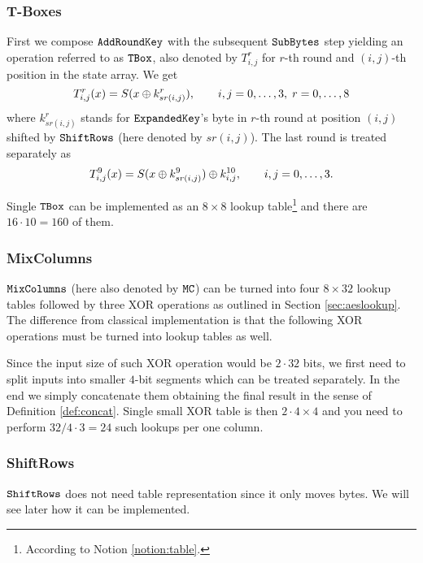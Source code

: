 \subsubsection{T-Boxes}
	
	First we compose $\texttt{AddRoundKey}$ with the subsequent $\texttt{SubBytes}$ step yielding an operation referred to as $\texttt{TBox}$, also denoted by $T_{i,j}^r$ for $r$-th round and $(i,j)$-th position in the state array. We get
	\begin{equation}
		T_{i,j}^r(x) = S(x\oplus k_{sr(i,j)}^r) , \qquad i,j=0 , \ldots , 3,\;r=0 , \ldots , 8
	\end{equation}
	where $k_{sr(i,j)}^r$ stands for $\texttt{ExpandedKey}$'s byte in $r$-th round at position $(i,j)$ shifted by $\texttt{ShiftRows}$ (here denoted by $sr(i,j)$). The last round is treated separately as
	\begin{equation}
		T_{i,j}^{9}(x) = S(x\oplus k_{sr(i,j)}^9) \oplus k_{i,j}^{10} , \qquad i,j=0 , \ldots , 3 .
	\end{equation}
	
	Single $\texttt{TBox}$ can be implemented as an $8\times 8$ lookup table\footnote{According to Notion \ref{notion:table}.} and there are $16\cdot 10 = 160$ of them.   %

\subsubsection{MixColumns}
	
	$\texttt{MixColumns}$ (here also denoted by $\texttt{MC}$) can be turned into four $8\times 32$ lookup tables followed by three XOR operations as outlined in Section \ref{sec:aeslookup}. The difference from classical implementation is that the following XOR operations must be turned into lookup tables as well.
	
	Since the input size of such XOR operation would be $2\cdot 32$ bits, we first need to split inputs into smaller $4$-bit segments which can be treated separately. In the end we simply concatenate them obtaining the final result in the sense of Definition \ref{def:concat}. Single small XOR table is then $2\cdot 4\times 4$ and you need to perform $32/4\cdot 3=24$ such lookups per one column.

\subsubsection{ShiftRows}
	
	$\texttt{ShiftRows}$ does not need table representation since it only moves bytes. We will see later how it can be implemented.



